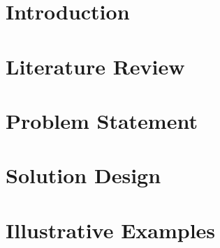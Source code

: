 \documentclass[11pt, a4paper]{article}
\numberwithin{equation}{section}
\theoremstyle{plain}
\theoremstyle{definition}
\theoremstyle{remark}
\begin{document}

\section{Introduction}
\label{sec:introduction}

\section{Literature Review}
\label{sec:literature-review}


\section{Problem Statement}
\label{sec:problem-statement}

 
\section{Solution Design}
\label{sec:solution-design}










 
\section{Illustrative Examples}
\label{sec:illustrative-examples}
 

 
\end{document}
